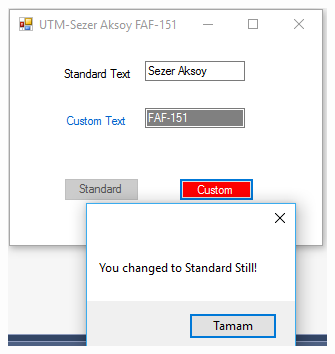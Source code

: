 \begin{figure}
	\centering
	\includegraphics[width=0.7\linewidth]{fourth.PNG}
	\caption{}
	\label{fig:fourth}
\end{figure}


\clearpage